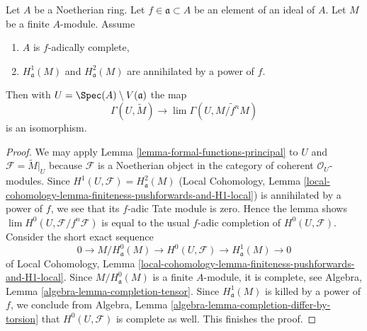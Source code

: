 \begin{lemma}
\label{lemma-alternative-H0}
Let $A$ be a Noetherian ring. Let $f \in \mathfrak a \subset A$
be an element of an ideal of $A$. Let $M$ be a finite $A$-module.
Assume
\begin{enumerate}
\item $A$ is $f$-adically complete,
\item $H^1_\mathfrak a(M)$ and $H^2_\mathfrak a(M)$ are
annihilated by a power of $f$.
\end{enumerate}
Then with $U = \Spec(A) \setminus V(\mathfrak a)$ the map
$$
\Gamma(U, \widetilde{M})
\longrightarrow
\lim \Gamma(U, \widetilde{M/f^nM})
$$
is an isomorphism.
\end{lemma}

\begin{proof}
We may apply Lemma \ref{lemma-formal-functions-principal} to $U$ and
$\mathcal{F} = \widetilde{M}|_U$ because $\mathcal{F}$ is a Noetherian object in
the category of coherent $\mathcal{O}_U$-modules.
Since $H^1(U, \mathcal{F}) = H^2_\mathfrak a(M)$
(Local Cohomology, Lemma
\ref{local-cohomology-lemma-finiteness-pushforwards-and-H1-local})
is annihilated by a power of $f$, we see that
its $f$-adic Tate module is zero.
Hence the lemma shows $\lim H^0(U, \mathcal{F}/f^n \mathcal{F})$
is equal to the usual $f$-adic completion of $H^0(U, \mathcal{F})$.
Consider the short exact sequence
$$
0 \to M/H^0_\mathfrak a(M) \to H^0(U, \mathcal{F}) \to H^1_\mathfrak a(M) \to 0
$$
of Local Cohomology, Lemma
\ref{local-cohomology-lemma-finiteness-pushforwards-and-H1-local}.
Since $M/H^0_\mathfrak a(M)$ is a finite $A$-module, it is
complete, see Algebra, Lemma \ref{algebra-lemma-completion-tensor}.
Since $H^1_\mathfrak a(M)$ is killed by a power of $f$, we conclude
from Algebra, Lemma \ref{algebra-lemma-completion-differ-by-torsion}
that $H^0(U, \mathcal{F})$ is complete as well. This finishes the proof.
\end{proof}
